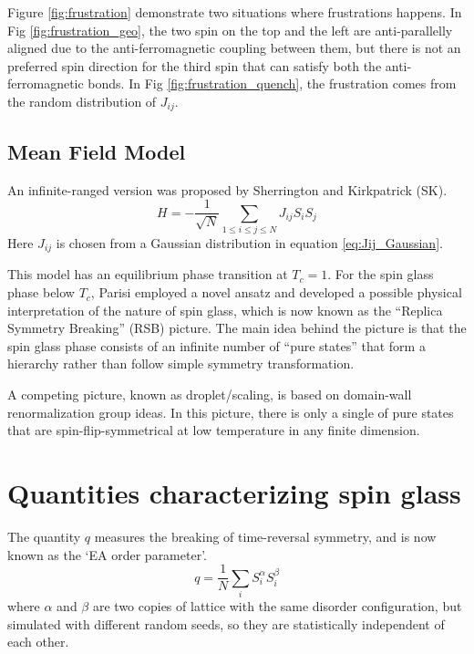 Figure \ref{fig:frustration} demonstrate two situations where frustrations 
happens. In Fig \ref{fig:frustration_geo}, the two spin on the top and the left
are anti-parallelly aligned due to the anti-ferromagnetic coupling between them,
but there is not an preferred spin direction for the third spin that can satisfy
both the anti-ferromagnetic bonds. In Fig \ref{fig:frustration_quench}, the 
frustration comes from the random distribution of $J_{ij}$. 

\subsection{Mean Field Model}
\label{sec:meanfield-model}

An infinite-ranged version was proposed by Sherrington and Kirkpatrick (SK).
\begin{equation}
  \label{eq:SK}
  H=-\frac{1}{\sqrt{N}}\sum_{1\le i\le j\le N}J_{ij}S_iS_j
\end{equation}
Here $J_{ij}$ is chosen from a Gaussian distribution in equation 
\ref{eq:Jij_Gaussian}.

This model has an equilibrium phase transition at $T_c = 1$.
For the spin glass phase below $T_c$, Parisi employed a novel ansatz and 
developed a  possible physical interpretation of the nature of spin glass, 
which is now known as the ``Replica Symmetry Breaking'' (RSB) picture. The main
idea behind the picture is that the spin glass phase consists of an infinite 
number of ``pure states'' that form a hierarchy rather than follow simple symmetry
transformation. 

A competing picture, known as droplet/scaling, is based on domain-wall 
renormalization group ideas. In this picture, there is only a single of
pure states that are spin-flip-symmetrical at low temperature in any finite 
dimension. 


\section{Quantities characterizing spin glass}
The quantity $q$ measures the breaking of time-reversal symmetry, and is now 
known as the ‘EA order parameter’.
\begin{equation}
  \label{eq:q}
  q=\frac{1}{N}\sum_iS_i^\alpha S_i^\beta
\end{equation}
where $\alpha$ and $\beta$ are two copies of lattice with the same disorder 
configuration, but simulated with different random seeds, so they are
statistically independent of each other. 

